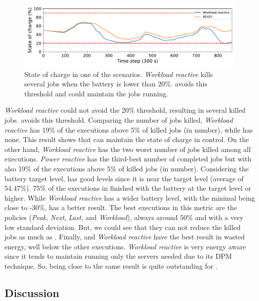\begin{figure}[!htb]
    \centering
    \includegraphics[scale=0.5]{Images/Heuristic/diff_state_of_charge.pdf}
    \caption{State of charge in one of the scenarios. \emph{Workload reactive} kills several jobs when the battery is lower than 20\%. \emph{\systemName} avoids this threshold and could maintain the jobs running.}
    \label{fig:soc_average}
\end{figure}

\emph{Workload reactive} could not avoid the 20\% threshold, resulting in several killed jobs. \emph{\systemName} avoids this threshold. Comparing the number of jobs killed, \emph{Workload reactive} has 19\% of the executions above 5\% of killed jobs (in number), while \emph{\systemName} has none. This result shows that \emph{\systemName} can maintain the state of charge in control. On the other hand, \emph{Workload reactive} has the two worst number of jobs killed among all executions. \emph{Power reactive} has the third-best number of completed jobs but with also 19\% of the executions above 5\% of killed jobs (in number). Considering the battery target level, \emph{\systemName} has good levels since it is near the target level (average of 54.47\%). 75\% of the executions in \emph{\systemName} finished with the battery at the target level or higher. While \emph{Workload reactive} has a wider battery level, with the minimal being close to -30\%, \emph{\systemName} has a better result. The best executions in this metric are the policies (\emph{Peak}, \emph{Next}, \emph{Last}, and \emph{Workload}), always around 50\% and with a very low standard deviation. But, we could see that they can not reduce the killed jobs as much as \emph{\systemName}. Finally, \emph{\systemName} and \emph{Workload reactive} have the best result in wasted energy, well below the other executions. \emph{Workload reactive} is very energy aware since it tends to maintain running only the servers needed due to its DPM technique. So, being close to the same result is quite outstanding for \emph{\systemName}. 

\subsection{Discussion}

